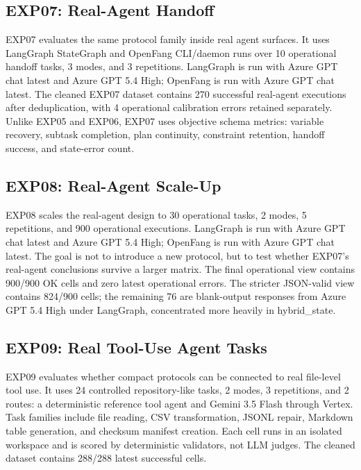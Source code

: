 \documentclass[11pt]{article}
\begin{document}
\subsection{EXP07: Real-Agent Handoff}
EXP07 evaluates the same protocol family inside real agent surfaces. It uses LangGraph StateGraph and OpenFang CLI/daemon runs over 10 operational handoff tasks, 3 modes, and 3 repetitions. LangGraph is run with Azure GPT chat latest and Azure GPT 5.4 High; OpenFang is run with Azure GPT chat latest. The cleaned EXP07 dataset contains 270 successful real-agent executions after deduplication, with 4 operational calibration errors retained separately. Unlike EXP05 and EXP06, EXP07 uses objective schema metrics: variable recovery, subtask completion, plan continuity, constraint retention, handoff success, and state-error count.

\subsection{EXP08: Real-Agent Scale-Up}
EXP08 scales the real-agent design to 30 operational tasks, 2 modes, 5 repetitions, and 900 operational executions. LangGraph is run with Azure GPT chat latest and Azure GPT 5.4 High; OpenFang is run with Azure GPT chat latest. The goal is not to introduce a new protocol, but to test whether EXP07's real-agent conclusions survive a larger matrix. The final operational view contains 900/900 OK cells and zero latest operational errors. The stricter JSON-valid view contains 824/900 cells; the remaining 76 are blank-output responses from Azure GPT 5.4 High under LangGraph, concentrated more heavily in hybrid\_state.

\subsection{EXP09: Real Tool-Use Agent Tasks}
EXP09 evaluates whether compact protocols can be connected to real file-level tool use. It uses 24 controlled repository-like tasks, 2 modes, 3 repetitions, and 2 routes: a deterministic reference tool agent and Gemini 3.5 Flash through Vertex. Task families include file reading, CSV transformation, JSONL repair, Markdown table generation, and checksum manifest creation. Each cell runs in an isolated workspace and is scored by deterministic validators, not LLM judges. The cleaned dataset contains 288/288 latest successful cells.
\end{document}
